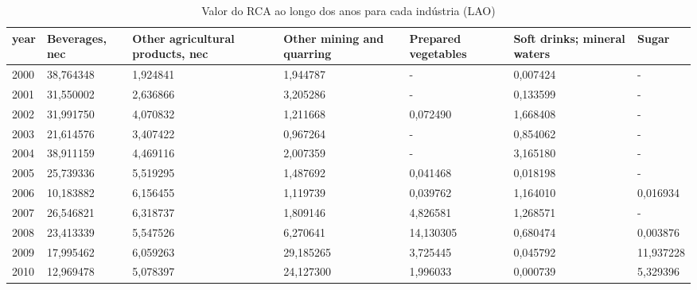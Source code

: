 \begin{table}
\centering
\caption{Valor do RCA ao longo dos anos para cada indústria (LAO)}
\begin{tabular}{p{1cm}p{2cm}p{2cm}p{2cm}p{2cm}p{2cm}p{2cm}}
\toprule
 year &  Beverages, nec &  Other agricultural products, nec &  Other mining and quarring &  Prepared vegetables &  Soft drinks; mineral waters &     Sugar \\
\midrule
 2000 &       38,764348 &                          1,924841 &                   1,944787 &                    - &                     0,007424 &         - \\
 2001 &       31,550002 &                          2,636866 &                   3,205286 &                    - &                     0,133599 &         - \\
 2002 &       31,991750 &                          4,070832 &                   1,211668 &             0,072490 &                     1,668408 &         - \\
 2003 &       21,614576 &                          3,407422 &                   0,967264 &                    - &                     0,854062 &         - \\
 2004 &       38,911159 &                          4,469116 &                   2,007359 &                    - &                     3,165180 &         - \\
 2005 &       25,739336 &                          5,519295 &                   1,487692 &             0,041468 &                     0,018198 &         - \\
 2006 &       10,183882 &                          6,156455 &                   1,119739 &             0,039762 &                     1,164010 &  0,016934 \\
 2007 &       26,546821 &                          6,318737 &                   1,809146 &             4,826581 &                     1,268571 &         - \\
 2008 &       23,413339 &                          5,547526 &                   6,270641 &            14,130305 &                     0,680474 &  0,003876 \\
 2009 &       17,995462 &                          6,059263 &                  29,185265 &             3,725445 &                     0,045792 & 11,937228 \\
 2010 &       12,969478 &                          5,078397 &                  24,127300 &             1,996033 &                     0,000739 &  5,329396 \\

\end{tabular}
\end{table}
